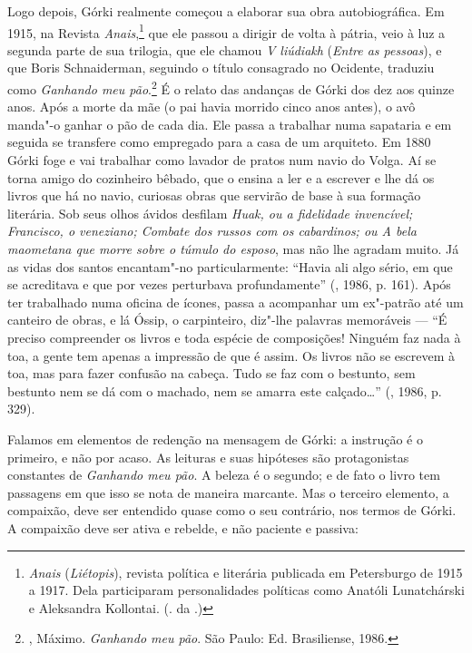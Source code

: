Logo depois, Górki realmente começou a elaborar sua obra
autobiográfica. Em 1915, na Revista \emph{Anais},\footnote{\emph{Anais}
(\emph{Liétopis}), revista política e literária publicada em
Petersburgo de 1915 a 1917. Dela participaram personalidades
políticas como Anatóli Lunatchárski e Aleksandra Kollontai.
(. da .)} que ele passou a dirigir de volta à
pátria, veio à luz a segunda parte de sua trilogia, que ele
chamou \emph{V liúdiakh} (\emph{Entre as pessoas}), e que Boris
Schnaiderman, seguindo o título consagrado no Ocidente, traduziu
como \emph{Ganhando meu pão}.\footnote{, Máximo.
\emph{Ganhando meu pão}. São Paulo: Ed. Brasiliense, 1986.} É
o relato das andanças de Górki dos dez aos quinze anos. Após a
morte da mãe (o pai havia morrido cinco anos antes), o avô
manda"-o ganhar o pão de cada dia. Ele passa a trabalhar
numa sapataria e em seguida se transfere como empregado para
a casa de um arquiteto. Em 1880 Górki foge e vai trabalhar como
lavador de pratos num navio do Volga. Aí se torna amigo do
cozinheiro bêbado, que o ensina a ler e a escrever e lhe dá os
livros que há no navio, curiosas obras que
servirão de base à sua formação literária. Sob seus olhos ávidos
desfilam \emph{Huak, ou a fidelidade invencível; Francisco, o veneziano;
Combate dos russos com os cabardinos; ou A bela maometana que morre
sobre o túmulo do esposo}, mas não lhe agradam muito. Já as vidas
dos santos encantam"-no particularmente: ``Havia ali algo sério,
em que se acreditava e que por vezes perturbava
profundamente'' (, 1986, p. 161). Após ter
trabalhado numa oficina de ícones, passa a acompanhar um
ex"-patrão até um canteiro de obras, e lá Óssip, o carpinteiro,
diz"-lhe palavras memoráveis --- ``É preciso compreender os
livros e toda espécie de composições! Ninguém faz nada à toa,
a gente tem apenas a impressão de que é assim. Os livros não se
escrevem à toa, mas para fazer confusão na cabeça. Tudo se faz
com o bestunto, sem bestunto nem se dá com o machado, nem se
amarra este calçado\ldots{}'' (, 1986, p. 329).

Falamos em elementos de redenção na mensagem de Górki: a instrução é o primeiro, e não por acaso. As leituras e suas hipóteses são protagonistas constantes de \emph{Ganhando meu pão}. A beleza é o segundo; e de fato o livro tem passagens em que isso se nota de maneira marcante. Mas o terceiro elemento, a compaixão, deve ser entendido quase como o seu contrário, nos termos de Górki. A compaixão deve ser ativa e rebelde, e não paciente e passiva: 

